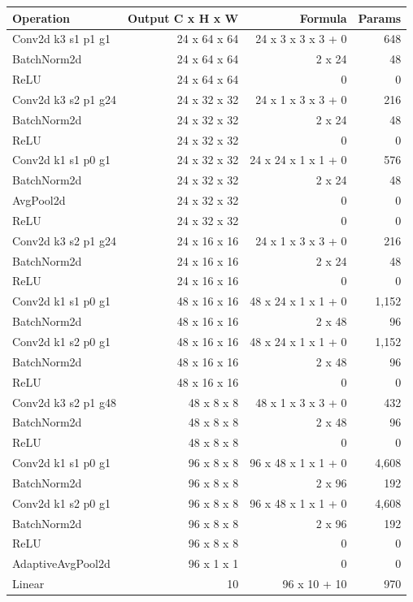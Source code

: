 \begin{tabular}{lrrr}
\toprule
Operation & Output C x H x W & Formula & Params \\
\midrule
Conv2d k3 s1 p1 g1 & 24 x 64 x 64 & 24 x 3 x 3 x 3 + 0 & 648 \\
BatchNorm2d & 24 x 64 x 64 & 2 x 24 & 48 \\
ReLU & 24 x 64 x 64 & 0 & 0 \\
Conv2d k3 s2 p1 g24 & 24 x 32 x 32 & 24 x 1 x 3 x 3 + 0 & 216 \\
BatchNorm2d & 24 x 32 x 32 & 2 x 24 & 48 \\
ReLU & 24 x 32 x 32 & 0 & 0 \\
Conv2d k1 s1 p0 g1 & 24 x 32 x 32 & 24 x 24 x 1 x 1 + 0 & 576 \\
BatchNorm2d & 24 x 32 x 32 & 2 x 24 & 48 \\
AvgPool2d & 24 x 32 x 32 & 0 & 0 \\
ReLU & 24 x 32 x 32 & 0 & 0 \\
Conv2d k3 s2 p1 g24 & 24 x 16 x 16 & 24 x 1 x 3 x 3 + 0 & 216 \\
BatchNorm2d & 24 x 16 x 16 & 2 x 24 & 48 \\
ReLU & 24 x 16 x 16 & 0 & 0 \\
Conv2d k1 s1 p0 g1 & 48 x 16 x 16 & 48 x 24 x 1 x 1 + 0 & 1,152 \\
BatchNorm2d & 48 x 16 x 16 & 2 x 48 & 96 \\
Conv2d k1 s2 p0 g1 & 48 x 16 x 16 & 48 x 24 x 1 x 1 + 0 & 1,152 \\
BatchNorm2d & 48 x 16 x 16 & 2 x 48 & 96 \\
ReLU & 48 x 16 x 16 & 0 & 0 \\
Conv2d k3 s2 p1 g48 & 48 x 8 x 8 & 48 x 1 x 3 x 3 + 0 & 432 \\
BatchNorm2d & 48 x 8 x 8 & 2 x 48 & 96 \\
ReLU & 48 x 8 x 8 & 0 & 0 \\
Conv2d k1 s1 p0 g1 & 96 x 8 x 8 & 96 x 48 x 1 x 1 + 0 & 4,608 \\
BatchNorm2d & 96 x 8 x 8 & 2 x 96 & 192 \\
Conv2d k1 s2 p0 g1 & 96 x 8 x 8 & 96 x 48 x 1 x 1 + 0 & 4,608 \\
BatchNorm2d & 96 x 8 x 8 & 2 x 96 & 192 \\
ReLU & 96 x 8 x 8 & 0 & 0 \\
AdaptiveAvgPool2d & 96 x 1 x 1 & 0 & 0 \\
Linear & 10 & 96 x 10 + 10 & 970 \\
\bottomrule
\end{tabular}
